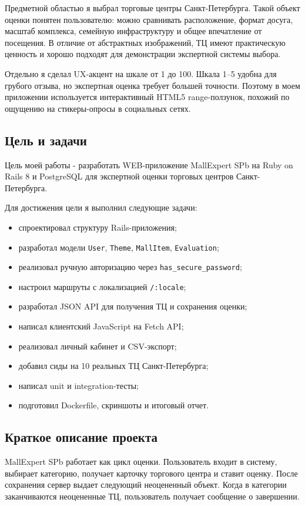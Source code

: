 \documentclass[14pt,a4paper]{extarticle}
\begin{document}
Предметной областью я выбрал торговые центры Санкт-Петербурга. Такой объект оценки понятен пользователю: можно сравнивать расположение, формат досуга, масштаб комплекса, семейную инфраструктуру и общее впечатление от посещения. В отличие от абстрактных изображений, ТЦ имеют практическую ценность и хорошо подходят для демонстрации экспертной системы выбора.

Отдельно я сделал UX-акцент на шкале от 1 до 100. Шкала 1--5 удобна для грубого отзыва, но экспертная оценка требует большей точности. Поэтому в моем приложении используется интерактивный HTML5 range-ползунок, похожий по ощущению на стикеры-опросы в социальных сетях.

\subsection{Цель и задачи}

Цель моей работы - разработать WEB-приложение MallExpert SPb на Ruby on Rails 8 и PostgreSQL для экспертной оценки торговых центров Санкт-Петербурга.

Для достижения цели я выполнил следующие задачи:
\begin{itemize}
  \item спроектировал структуру Rails-приложения;
  \item разработал модели \texttt{User}, \texttt{Theme}, \texttt{MallItem}, \texttt{Evaluation};
  \item реализовал ручную авторизацию через \texttt{has\_secure\_password};
  \item настроил маршруты с локализацией \texttt{/:locale};
  \item разработал JSON API для получения ТЦ и сохранения оценки;
  \item написал клиентский JavaScript на Fetch API;
  \item реализовал личный кабинет и CSV-экспорт;
  \item добавил сиды на 10 реальных ТЦ Санкт-Петербурга;
  \item написал unit и integration-тесты;
  \item подготовил Dockerfile, скриншоты и итоговый отчет.
\end{itemize}

\subsection{Краткое описание проекта}

MallExpert SPb работает как цикл оценки. Пользователь входит в систему, выбирает категорию, получает карточку торгового центра и ставит оценку. После сохранения сервер выдает следующий неоцененный объект. Когда в категории заканчиваются неоцененные ТЦ, пользователь получает сообщение о завершении.
\end{document}
